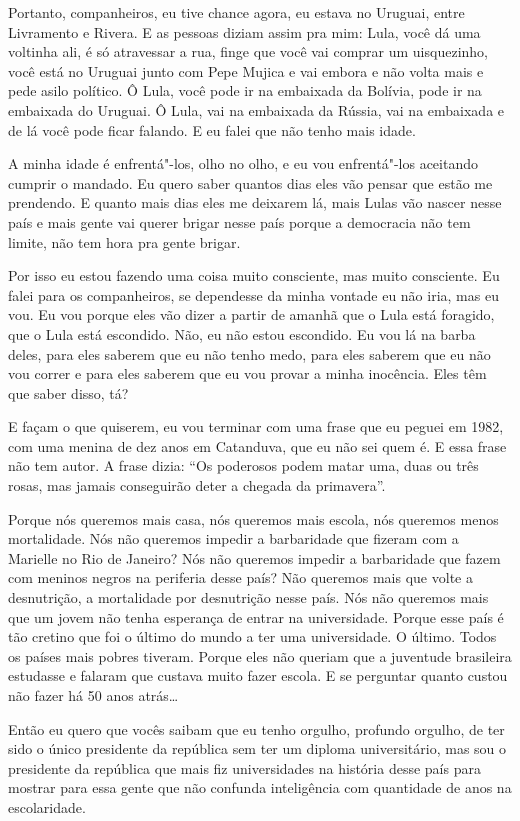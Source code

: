 Portanto, companheiros, eu tive chance agora, eu estava no Uruguai,
entre Livramento e Rivera. E as pessoas diziam assim pra mim: Lula, você
dá uma voltinha ali, é só atravessar a rua, finge que você vai comprar
um uisquezinho, você está no Uruguai junto com Pepe Mujica e vai
embora e não volta mais e pede asilo político. Ô Lula, você pode ir na
embaixada da Bolívia, pode ir na embaixada do Uruguai. Ô Lula, vai na
embaixada da Rússia, vai na embaixada e de lá você pode ficar falando. E
eu falei que não tenho mais idade.

A minha idade é enfrentá"-los, olho no olho, e eu vou enfrentá"-los
aceitando cumprir o mandado. Eu quero saber quantos dias eles vão pensar
que estão me prendendo. E quanto mais dias eles me deixarem lá, mais
Lulas vão nascer nesse país e mais gente vai querer brigar nesse país
porque a democracia não tem limite, não tem hora pra gente brigar.

Por isso eu estou fazendo uma coisa muito consciente, mas muito
consciente. Eu falei para os companheiros, se dependesse da minha
vontade eu não iria, mas eu vou. Eu vou porque eles vão dizer a partir
de amanhã que o Lula está foragido, que o Lula está escondido. Não, eu
não estou escondido. Eu vou lá na barba deles, para eles saberem que eu
não tenho medo, para eles saberem que eu não vou correr e para eles
saberem que eu vou provar a minha inocência. Eles têm que saber disso,
tá?

E façam o que quiserem, eu vou terminar com uma frase que eu
peguei em 1982, com uma menina de dez anos em Catanduva, que eu não sei
quem é. E essa frase não tem autor. A frase dizia: ``Os poderosos podem
matar uma, duas ou três rosas, mas jamais conseguirão deter a chegada da
primavera''.

Porque nós queremos mais casa, nós queremos mais escola, nós
queremos menos mortalidade. Nós não queremos impedir a barbaridade que
fizeram com a Marielle no Rio de Janeiro? Nós não queremos impedir a
barbaridade que fazem com meninos negros na periferia desse país? Não
queremos mais que volte a desnutrição, a mortalidade por desnutrição
nesse país. Nós não queremos mais que um jovem não tenha esperança de
entrar na universidade. Porque esse país é tão cretino que foi o último
do mundo a ter uma universidade. O último. Todos os países mais pobres
tiveram. Porque eles não queriam que a juventude brasileira estudasse e
falaram que custava muito fazer escola. E se perguntar quanto custou não
fazer há 50 anos atrás\ldots{}

Então eu quero que vocês saibam que eu tenho orgulho, profundo
orgulho, de ter sido o único presidente da república sem ter um diploma
universitário, mas sou o presidente da república que mais fiz
universidades na história desse país para mostrar para essa gente que
não confunda inteligência com quantidade de anos na escolaridade.

